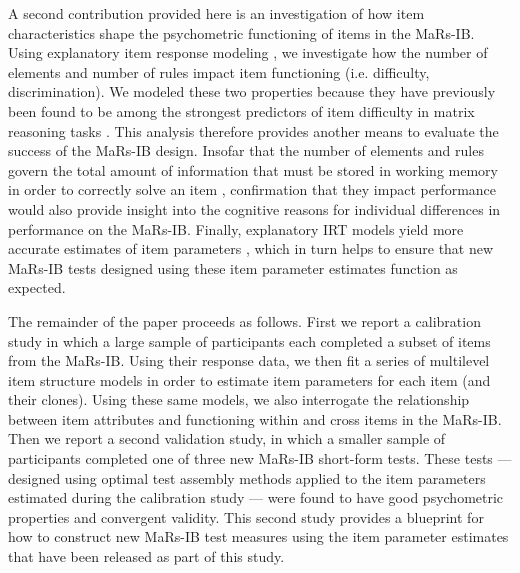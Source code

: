 \documentclass[a4paper,man,natbib]{apa6}
\begin{document}
A second contribution provided here is an investigation of how item characteristics shape the psychometric functioning of items in the MaRs-IB. Using explanatory item response modeling \citep{de2004explanatory, wilson2008explanatory}, we investigate how the number of elements and number of rules impact item functioning (i.e. difficulty, discrimination). We modeled these two properties because they have previously been found to be among the strongest predictors of item difficulty in matrix reasoning tasks \citep{primi2001complexity}. This analysis therefore provides another means to evaluate the success of the MaRs-IB design. Insofar that the number of elements and rules govern the total amount of information that must be stored in working memory in order to correctly solve an item \citep{embretson1998cognitive}, confirmation that they impact performance would also provide insight into the cognitive reasons for individual differences in performance on the MaRs-IB. Finally, explanatory IRT models yield more accurate estimates of item parameters \citep{neuhaus2006separating}, which in turn helps to ensure that new MaRs-IB tests designed using these item parameter estimates function as expected.


The remainder of the paper proceeds as follows. First we report a calibration study in which a large sample of participants each completed a subset of items from the MaRs-IB. Using their response data, we then fit a series of multilevel item structure models in order to estimate item parameters for each item (and their clones). Using these same models, we also interrogate the relationship between item attributes and functioning within and cross items in the MaRs-IB. Then we report a second validation study, in which a smaller sample of participants completed one of three new MaRs-IB short-form tests. These tests --- designed using optimal test assembly methods applied to the item parameters estimated during the calibration study --- were found to have good psychometric properties and convergent validity. This second study provides a blueprint for how to construct new MaRs-IB test measures using the item parameter estimates that have been released as part of this study.
\end{document}
